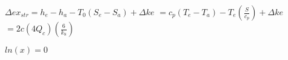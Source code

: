 \( \Delta ex_{str} = h_e - h_a - T_0 (S_e - S_a) + \Delta ke \)  
\( = c_p (T_e - T_a) - T_e \left( \frac{S}{c_p} \right) + \Delta ke \)  
\( = 2c (4Q_c) \left( \frac{6}{k_8} \right) \)  

\( ln(x) = 0 \)